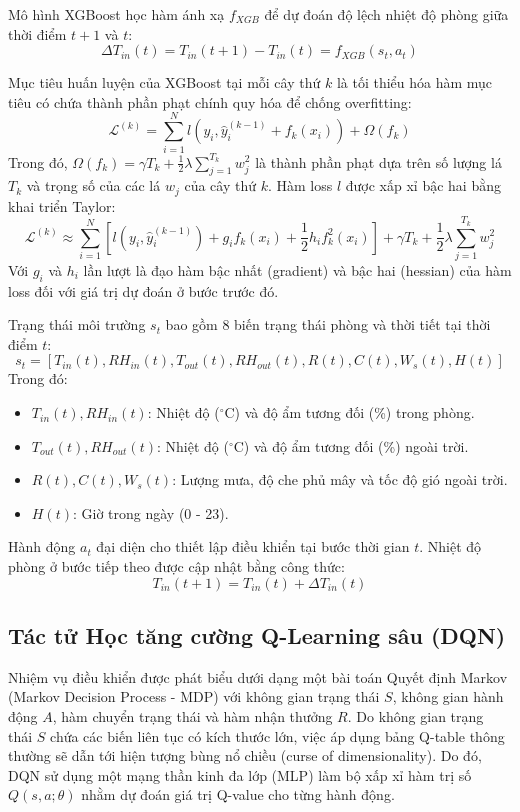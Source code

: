 \documentclass[12pt, a4paper]{article}
\begin{document}
Mô hình XGBoost học hàm ánh xạ $f_{XGB}$ để dự đoán độ lệch nhiệt độ phòng giữa thời điểm $t+1$ và $t$:
\begin{equation}
\Delta T_{in}(t) = T_{in}(t+1) - T_{in}(t) = f_{XGB}(s_t, a_t)
\end{equation}

Mục tiêu huấn luyện của XGBoost tại mỗi cây thứ $k$ là tối thiểu hóa hàm mục tiêu có chứa thành phần phạt chính quy hóa để chống overfitting:
\begin{equation}
\mathcal{L}^{(k)} = \sum_{i=1}^{N} l\left(y_i, \hat{y}_i^{(k-1)} + f_k(x_i)\right) + \Omega(f_k)
\end{equation}
Trong đó, $\Omega(f_k) = \gamma T_k + \frac{1}{2} \lambda \sum_{j=1}^{T_k} w_j^2$ là thành phần phạt dựa trên số lượng lá $T_k$ và trọng số của các lá $w_j$ của cây thứ $k$. Hàm loss $l$ được xấp xỉ bậc hai bằng khai triển Taylor:
\begin{equation}
\mathcal{L}^{(k)} \approx \sum_{i=1}^{N} \left[ l(y_i, \hat{y}_i^{(k-1)}) + g_i f_k(x_i) + \frac{1}{2} h_i f_k^2(x_i) \right] + \gamma T_k + \frac{1}{2} \lambda \sum_{j=1}^{T_k} w_j^2
\end{equation}
Với $g_i$ và $h_i$ lần lượt là đạo hàm bậc nhất (gradient) và bậc hai (hessian) của hàm loss đối với giá trị dự đoán ở bước trước đó.

Trạng thái môi trường $s_t$ bao gồm 8 biến trạng thái phòng và thời tiết tại thời điểm $t$:
\begin{equation}
s_t = [T_{in}(t), RH_{in}(t), T_{out}(t), RH_{out}(t), R(t), C(t), W_s(t), H(t)]
\end{equation}
Trong đó:
\begin{itemize}
    \item $T_{in}(t), RH_{in}(t)$: Nhiệt độ ($^\circ\text{C}$) và độ ẩm tương đối (\%) trong phòng.
    \item $T_{out}(t), RH_{out}(t)$: Nhiệt độ ($^\circ\text{C}$) và độ ẩm tương đối (\%) ngoài trời.
    \item $R(t), C(t), W_s(t)$: Lượng mưa, độ che phủ mây và tốc độ gió ngoài trời.
    \item $H(t)$: Giờ trong ngày (0 - 23).
\end{itemize}
Hành động $a_t$ đại diện cho thiết lập điều khiển tại bước thời gian $t$. Nhiệt độ phòng ở bước tiếp theo được cập nhật bằng công thức:
\begin{equation}
T_{in}(t+1) = T_{in}(t) + \Delta T_{in}(t)
\end{equation}

\subsection{Tác tử Học tăng cường Q-Learning sâu (DQN)}
Nhiệm vụ điều khiển được phát biểu dưới dạng một bài toán Quyết định Markov (Markov Decision Process - MDP) với không gian trạng thái $S$, không gian hành động $A$, hàm chuyển trạng thái và hàm nhận thưởng $R$. Do không gian trạng thái $S$ chứa các biến liên tục có kích thước lớn, việc áp dụng bảng Q-table thông thường sẽ dẫn tới hiện tượng bùng nổ chiều (curse of dimensionality). Do đó, DQN \cite{dqn} sử dụng một mạng thần kinh đa lớp (MLP) làm bộ xấp xỉ hàm trị số $Q(s, a; \theta)$ nhằm dự đoán giá trị Q-value cho từng hành động.
\end{document}
